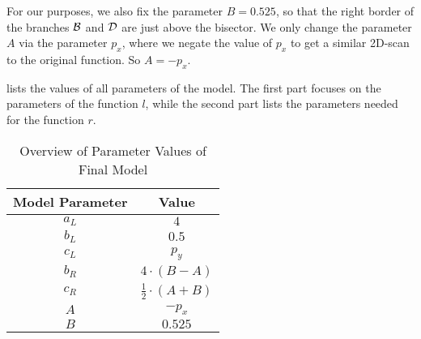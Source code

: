 For our purposes, we also fix the parameter $B = 0.525$, so that the right border of the branches $\mathcal{B}$ and $\mathcal{D}$ are just above the bisector.
We only change the parameter $A$ via the parameter $p_x$, where we negate the value of $p_x$ to get a similar 2D-scan to the original function.
So $A = -p_x$.

 lists the values of all parameters of the model.
The first part focuses on the parameters of the function $l$, while the second part lists the parameters needed for the function $r$.

\begin{table}
    \centering
    \begin{tabular}{|c|c|}
        \hline
        Model Parameter & Value                       \\ \hline \hline
        $a_L$           & $4$                         \\ \hline
        $b_L$           & $0.5$                       \\ \hline
        $c_L$           & $p_y$                       \\ \hline \hline
        $b_R$           & $4 \cdot (B - A)$           \\ \hline
        $c_R$           & $\frac{1}{2} \cdot (A + B)$ \\ \hline
        $A$             & $-p_x$                      \\ \hline
        $B$             & $0.525$                     \\ \hline
    \end{tabular}
    \caption{Overview of Parameter Values of Final Model}
    \label{tab:final.def.parameters.overview}
\end{table}
